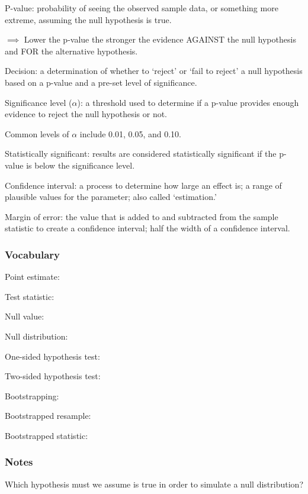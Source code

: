 \documentclass[
]{report}
\newcommand{\rgs}{\vspace{12pt}} %
\newcommand{\rgi}{\hspace{24pt}}  %
\begin{document}
P-value: probability of seeing the observed sample data, or something more extreme, assuming the null hypothesis is true.

\(\implies\) Lower the p-value the stronger the evidence AGAINST the null hypothesis and FOR the alternative hypothesis.

Decision: a determination of whether to `reject' or `fail to reject' a null hypothesis based on a p-value and a pre-set level of significance.

Significance level (\(\alpha\)): a threshold used to determine if a p-value provides enough evidence to reject the null hypothesis or not.

\rgi Common levels of \(\alpha\) include 0.01, 0.05, and 0.10.

Statistically significant: results are considered statistically significant if the p-value is below the significance level.

Confidence interval: a process to determine how large an effect is; a range of plausible values for the parameter; also called `estimation.'

Margin of error: the value that is added to and subtracted from the sample statistic to create a confidence interval; half the width of a confidence interval.

\hypertarget{vocabulary-11}{%
\subsubsection*{Vocabulary}\label{vocabulary-11}}

Point estimate:
\rgs

Test statistic:
\rgs

Null value:
\rgs

Null distribution:
\rgs

One-sided hypothesis test:
\rgs

Two-sided hypothesis test:
\rgs

Bootstrapping:
\rgs

Bootstrapped resample:
\rgs

Bootstrapped statistic:
\rgs

\hypertarget{notes-16}{%
\subsubsection*{Notes}\label{notes-16}}

Which hypothesis must we assume is true in order to simulate a null distribution?
\rgs
\end{document}
